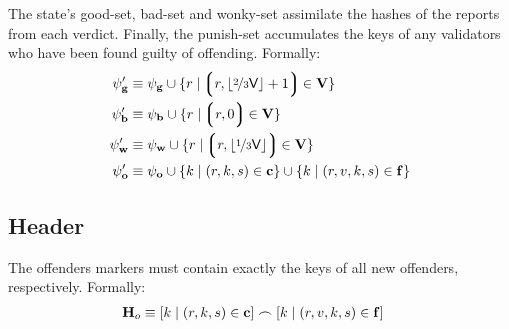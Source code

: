 The state's good-set, bad-set and wonky-set assimilate the hashes of the reports from each verdict. Finally, the punish-set accumulates the keys of any validators who have been found guilty of offending. Formally:
\begin{align}
  \goodset' &\equiv \goodset \cup \{r \mid \tup{r, \floor{\nicefrac{2}{3}\mathsf{V}} + 1} \in \verdicts \} \\
  \badset' &\equiv \badset \cup \{r \mid \tup{r, 0} \in \verdicts \} \\
  \wonkyset' &\equiv \wonkyset \cup \{r \mid \tup{r, \floor{\nicefrac{1}{3}\mathsf{V}}} \in \verdicts \} \\
  \offenders' &\equiv \offenders \cup \{ k \mid (r, k, s) \in \xtculprits \}\cup \{ k \mid (r, v, k, s) \in \xtfaults \}
\end{align}

\subsection{Header}\label{sec:judgementmarker}

The offenders markers must contain exactly the keys of all new offenders, respectively. Formally:
\begin{align}
  \mathbf{H}_o &\equiv \sq{ k \mid (r, k, s) \in \xtculprits} \frown \sq{ k \mid (r, v, k, s) \in \xtfaults }
\end{align}
